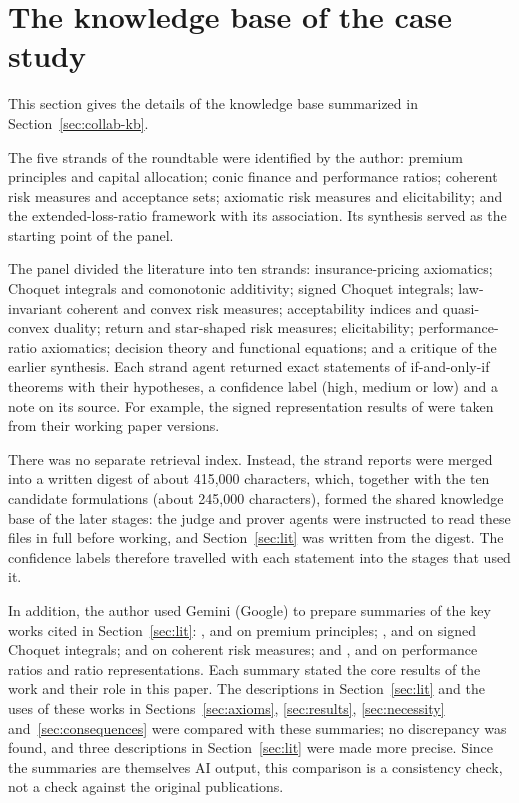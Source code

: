 \section{The knowledge base of the case study}\label{supp:kb}

This section gives the details of the knowledge base summarized in Section~\ref{sec:collab-kb}.

The five strands of the roundtable were identified by the author: premium principles and capital allocation;
conic finance and performance ratios; coherent risk measures and acceptance sets; axiomatic risk measures and
elicitability; and the extended-loss-ratio framework with its association. Its synthesis served as the starting
point of the panel.

The panel divided the literature into ten strands: insurance-pricing axiomatics; Choquet integrals and comonotonic
additivity; signed Choquet integrals; law-invariant coherent and convex risk measures; acceptability indices and
quasi-convex duality; return and star-shaped risk measures; elicitability; performance-ratio axiomatics; decision
theory and functional equations; and a critique of the earlier synthesis. Each strand agent returned exact
statements of if-and-only-if theorems with their hypotheses, a confidence label (high, medium or low) and a note
on its source. For example, the signed representation results of
\citet{cmmm2012,cmmm2015} were taken from their working paper versions.

There was no separate retrieval index. Instead, the strand reports were merged into a written digest of about
415{,}000 characters, which, together with the ten candidate formulations (about 245{,}000 characters), formed the
shared knowledge base of the later stages: the judge and prover agents were instructed to read these files in full
before working, and Section~\ref{sec:lit} was written from the digest. The confidence labels therefore
travelled with each statement into the stages that used it.

In addition, the author used Gemini (Google) to prepare summaries of the key works cited in
Section~\ref{sec:lit}: \citet{gerber1974}, \citet{yaari1987} and \citet{wyp1997} on premium principles;
\citet{msm1994}, \citet{cmmm2012,cmmm2015} and \citet{www2020} on signed Choquet integrals; \citet{adeh1999} and
\citet{kusuoka2001} on coherent risk measures; and \citet{chernymadan2009}, \citet{chew1983} and \citet{dekel1986} on
performance ratios and ratio representations. Each summary stated the core results of the work and their role in
this paper. The descriptions in Section~\ref{sec:lit} and the uses of these works in Sections~\ref{sec:axioms},
\ref{sec:results}, \ref{sec:necessity} and~\ref{sec:consequences} were compared with these summaries; no
discrepancy was found, and three descriptions in Section~\ref{sec:lit} were made more precise. Since the summaries
are themselves AI output, this comparison is a consistency check, not a check against the original publications.

